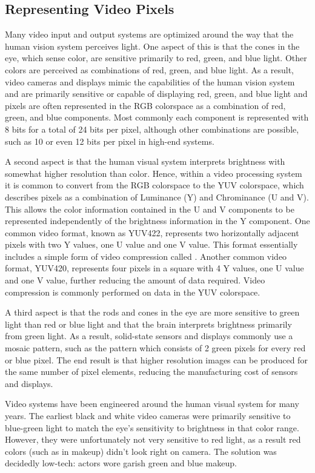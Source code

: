 \subsection{Representing Video Pixels}
Many video input and output systems are optimized around the way that the human vision system perceives light.  One aspect of this is that the cones in the eye, which sense color, are sensitive primarily to red, green, and blue light.  Other colors are perceived as combinations of red, green, and blue light. As a result, video cameras and displays mimic the capabilities of the human vision system and are primarily sensitive or capable of displaying red, green, and blue light and pixels are often represented in the RGB colorspace as a combination of red, green, and blue components.  Most commonly each component is represented with 8 bits for a total of 24 bits per pixel, although other combinations are possible, such as 10 or even 12 bits per pixel in high-end systems. 

A second aspect is that the human visual system interprets brightness with somewhat higher resolution than color. Hence, within a video processing system it is common to convert from the RGB colorspace to the YUV colorspace, which describes pixels as a combination of Luminance (Y) and Chrominance (U and V).  This allows the color information contained in the U and V components to be represented independently of the brightness information in the Y component. One common video format, known as YUV422, represents two horizontally adjacent pixels with two Y values, one U value and one V value.  This format essentially includes a simple form of video compression called .  Another common video format, YUV420, represents four pixels in a square with 4 Y values, one U value and one V value, further reducing the amount of data required.  Video compression is commonly performed on data in the YUV colorspace.

A third aspect is that the rods and cones in the eye are more sensitive to green light than red or blue light and that the brain interprets brightness primarily from green light. As a result, solid-state sensors and displays commonly use a mosaic pattern, such as the  pattern\cite{bayer76} which consists of 2 green pixels for every red or blue pixel.  The end result is that higher resolution images can be produced for the same number of pixel elements, reducing the manufacturing cost of sensors and displays.

\begin{aside}
Video systems have been engineered around the human visual system for many years.  The earliest black and white video cameras were primarily sensitive to blue-green light to match the eye's sensitivity to brightness in that color range.  However, they were unfortunately not very sensitive to red light, as a result red colors (such as in makeup) didn't look right on camera.  The solution was decidedly low-tech: actors wore garish green and blue makeup.
\end{aside}

